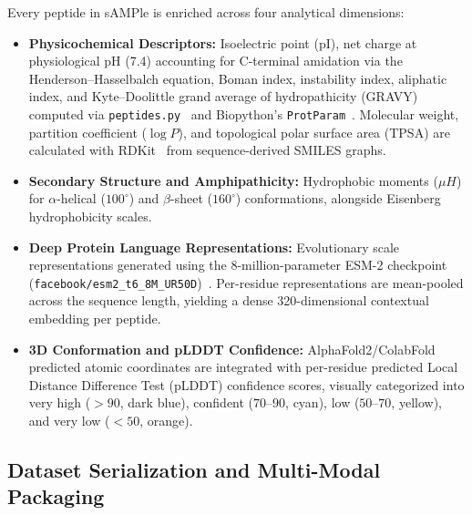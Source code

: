 \documentclass[unnumsec,webpdf,contemporary,large]{oup-authoring-template}%
\begin{document}
Every peptide in sAMPle is enriched across four analytical dimensions:
\begin{itemize}
    \item \textbf{Physicochemical Descriptors:} Isoelectric point (pI), net charge at physiological pH (7.4) accounting for C-terminal amidation via the Henderson--Hasselbalch equation, Boman index, instability index, aliphatic index, and Kyte--Doolittle grand average of hydropathicity (GRAVY) computed via \texttt{peptides.py}~\cite{osorio2015peptides} and Biopython's \texttt{ProtParam}~\cite{cock2009biopython}. Molecular weight, partition coefficient ($\log P$), and topological polar surface area (TPSA) are calculated with RDKit~\cite{landrum2013rdkit} from sequence-derived SMILES graphs.
    \item \textbf{Secondary Structure and Amphipathicity:} Hydrophobic moments ($\mu H$) for $\alpha$-helical ($100^\circ$) and $\beta$-sheet ($160^\circ$) conformations, alongside Eisenberg hydrophobicity scales.
    \item \textbf{Deep Protein Language Representations:} Evolutionary scale representations generated using the 8-million-parameter ESM-2 checkpoint (\texttt{facebook/esm2\_t6\_8M\_UR50D})~\cite{lin2023evolutionary}. Per-residue representations are mean-pooled across the sequence length, yielding a dense 320-dimensional contextual embedding per peptide.
    \item \textbf{3D Conformation and pLDDT Confidence:} AlphaFold2/ColabFold~\cite{jumper2021highly,mirdita2022colabfold} predicted atomic coordinates are integrated with per-residue predicted Local Distance Difference Test (pLDDT) confidence scores, visually categorized into very high ($>90$, dark blue), confident ($70$--$90$, cyan), low ($50$--$70$, yellow), and very low ($<50$, orange).
\end{itemize}

\subsection{Dataset Serialization and Multi-Modal Packaging}
\end{document}
